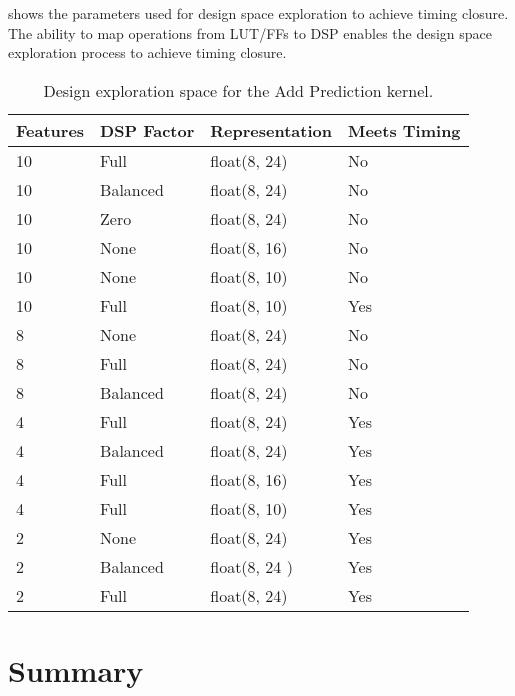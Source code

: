  shows the parameters used for design space
exploration to achieve timing closure. The ability to map operations
from LUT/FFs to DSP enables the design space exploration process to
achieve timing closure.
\begin{table}
\renewcommand{\arraystretch}{1.2}
\begin{tabularx}{\textwidth}{X|X|X|X}
  \textbf{Features} & \textbf{DSP Factor} & \textbf{Representation} & \textbf{Meets Timing} \\
 \hline \hline
 10        & Full       & float(8, 24)   & No           \\
 10        & Balanced   & float(8, 24)   & No           \\
 10        & Zero       & float(8, 24)   & No           \\
 10        & None       & float(8, 16)   & No           \\
 10        & None       & float(8, 10)   & No          \\
 10        & Full       & float(8, 10)   & Yes          \\
 8         & None       & float(8, 24)   & No           \\
 8         & Full       & float(8, 24)   & No           \\
 8         & Balanced   & float(8, 24)   & No           \\
 4         & Full       & float(8, 24)   & Yes          \\
 4         & Balanced   & float(8, 24)   & Yes          \\
 4         & Full       & float(8, 16)   & Yes          \\
 4         & Full       & float(8, 10)   & Yes          \\
 2         & None       & float(8, 24)   & Yes          \\
 2         & Balanced   & float(8, 24 )  & Yes          \\
 2         & Full       & float(8, 24)   & Yes          \\

\end{tabularx}
\caption{Design exploration space for the Add Prediction kernel.}
\label{table:adp-dse}
\end{table}

\section{Summary}

